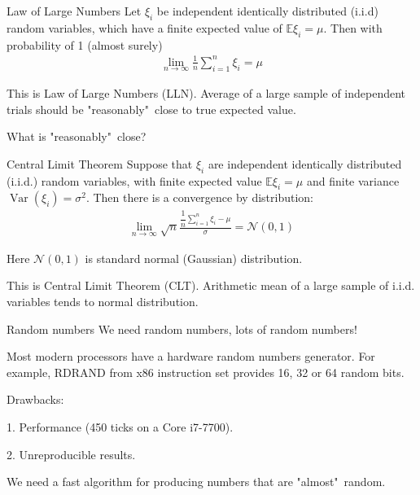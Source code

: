 \documentclass{beamer}
\begin{document}
\begin{frame}{Law of Large Numbers}
\justify
Let  $\xi_i$ be independent identically distributed (i.i.d) random variables, which have a finite expected value of $\mathbb{E}\xi_i=\mu$. Then with probability of 1 (almost surely)
\begin{align*}
\lim_{n \to \infty} \frac{1}{n} \sum\limits_{i=1}^{n}\xi_i = \mu
\end{align*}

\justify
This is \alert{Law of Large Numbers} (LLN). Average of a large sample of independent trials should be "reasonably"\ close to true expected value.

\justify
What is "reasonably"\ close?
\end{frame}



\begin{frame}{Central Limit Theorem}
\justify
Suppose that $\xi_i$ are independent identically distributed (i.i.d.) random variables, with finite expected value $\mathbb{E}\xi_i=\mu$ and finite variance $\operatorname{Var}(\xi_i) = \sigma^2$. Then there is a convergence by distribution:
\begin{align*}
\lim_{n \to \infty} \sqrt{n}\frac{\dfrac{1}{n}\sum\limits_{i=1}^{n}\xi_i - \mu}{\sigma} = \mathcal{N}(0, 1)
\end{align*}

\justify
Here $\mathcal{N}(0, 1)$ is standard normal (Gaussian) distribution.

\justify
This is \alert{Central Limit Theorem} (CLT). Arithmetic mean of a large sample of i.i.d. variables tends to normal distribution.
\end{frame}




\begin{frame}{Random numbers}
\justify
We need random numbers, lots of random numbers!

\justify
Most modern processors have a hardware random numbers generator. For example, RDRAND from x86 instruction set provides 16, 32 or 64 random bits.

\justify
Drawbacks:

1. Performance (450 ticks on a Core i7-7700).

2. Unreproducible results.

\justify
We need a fast algorithm for producing numbers that are "almost"\ random.
\end{frame}
\end{document}
